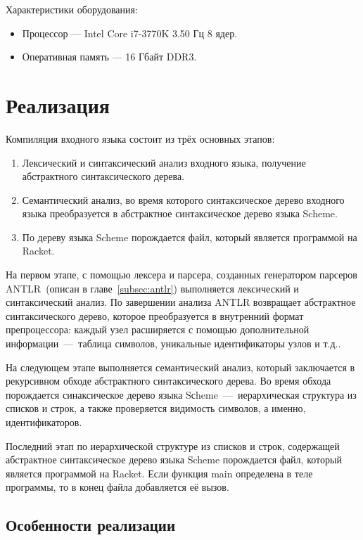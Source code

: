 \documentclass[12pt,a4paper,oneside]{extarticle}
\begin{document}
        \noindent Характеристики оборудования:
        \begin{itemize}
            \item Процессор --- Intel Core i7-3770K 3.50 Гц 8 ядер.
            \item Оперативная память --- 16 Гбайт DDR3.
        \end{itemize}
\clearpage

\section{Реализация}
    Компиляция входного языка состоит из трёх основных этапов: 
    \begin{enumerate}
        \item Лексический и синтаксический анализ входного языка, получение абстрактного синтаксического дерева.
        \item Семантический анализ, во время которого синтаксическое дерево входного языка преобразуется в абстрактное синтаксическое дерево языка Scheme.
        \item По дереву языка Scheme порождается файл, который является программой на Racket.
    \end{enumerate}

    На первом этапе, с помощью лексера и парсера, созданных генератором парсеров ANTLR~(описан в главе~\ref{subsec:antlr}) выполняется лексический и синтаксический анализ.
    По завершении анализа ANTLR возвращает абстрактное синтаксического дерево, которое преобразуется в внутренний формат препроцессора: каждый узел расширяется с помощью дополнительной информации~---~таблица символов, уникальные идентификаторы узлов и т.д..

    На следующем этапе выполняется семантический анализ, который заключается в рекурсивном обходе абстрактного синтаксического дерева.
    Во время обхода порождается синаксическое дерево языка Sсheme~---~иерархическая структура из списков и строк, а также проверяется видимость символов, а именно, идентификаторов.

    Последний этап по иерархической структуре из списков и строк, содержащей абстрактное синтаксическое дерево языка Scheme порождается файл, который является программой на Racket.
    Если функция main определена в теле программы, то в конец файла добавляется её вызов.

    \clearpage

    \subsection{Особенности реализации}
\end{document}
